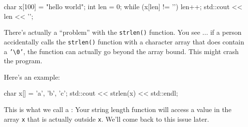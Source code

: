 \begin{consolethree}[escapeinside=||]
char x[100] = "hello world";
int len = 0;
while (x[len] != '\0')
{
    len++;
}
std::cout << len << '\n';
\end{consolethree}

There's actually a ``problem'' with the \texttt{strlen()} function. You see ... if a person accidentally calls the \texttt{strlen()} function with a character array that does  contain a \texttt{'\textbackslash 0'}, the function can actually go beyond the array bound. This might crash the program.

Here's an example:

\begin{consolethree}[escapeinside=||]
char x[] = {'a', 'b', 'c'};
std::cout << strlen(x) << std::endl;
\end{consolethree}

This is what we call a : Your string length function will access a value in the array \texttt{x} that is actually outside \texttt{x}. We'll come back to this issue later.


